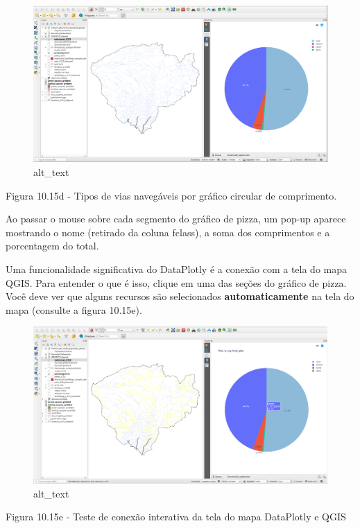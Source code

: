 \documentclass[
]{book}
\begin{document}
\begin{figure}
\centering
\includegraphics{media/modulo10/fig1015_d.png}
\caption{alt\_text}
\end{figure}

Figura 10.15d - Tipos de vias navegáveis \hspace{0pt}\hspace{0pt}por gráfico circular de comprimento.

Ao passar o mouse sobre cada segmento do gráfico de pizza, um pop-up aparece mostrando o nome (retirado da coluna fclass), a soma dos comprimentos e a porcentagem do total.

Uma funcionalidade significativa do DataPlotly é a conexão com a tela do mapa QGIS. Para entender o que é isso, clique em uma das seções do gráfico de pizza. Você deve ver que alguns recursos são selecionados \textbf{automaticamente} na tela do mapa (consulte a figura 10.15e).

\begin{figure}
\centering
\includegraphics{media/modulo10/fig1015_e.png}
\caption{alt\_text}
\end{figure}

Figura 10.15e - Teste de conexão interativa da tela do mapa DataPlotly e QGIS
\end{document}

